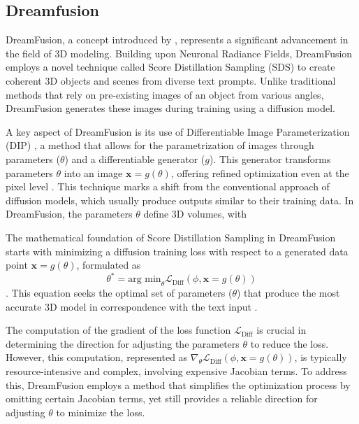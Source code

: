 \subsection{Dreamfusion}\label{dreamfusion}

DreamFusion, a concept introduced by \citeauthor{pooleDreamfusion}, represents a significant advancement in the field of 3D modeling. Building upon Neuronal Radiance Fields, DreamFusion employs a novel technique called Score Distillation Sampling (SDS) to create coherent 3D objects and scenes from diverse text prompts. Unlike traditional methods that rely on pre-existing images of an object from various angles, DreamFusion generates these images during training using a diffusion model.

A key aspect of DreamFusion is its use of Differentiable Image Parameterization (DIP) \citep{mordvintsevDIP}, a method that allows for the parametrization of images through parameters (\( \theta \)) and a differentiable generator (\( g \)). This generator transforms parameters \( \theta \) into an image \( \mathbf{x} = g(\theta) \), offering refined optimization even at the pixel level \citep{pooleDreamfusion}. This technique marks a shift from the conventional approach of diffusion models, which usually produce outputs similar to their training data. In DreamFusion, the parameters \( \theta \) define 3D volumes, with \

The mathematical foundation of Score Distillation Sampling in DreamFusion starts with minimizing a diffusion training loss with respect to a generated data point \( \mathbf{x} = g(\theta) \), formulated as \[ \theta^{*} = \text{arg min}_{\theta} \mathcal{L}_{\text{Diff}}(\phi, \mathbf{x} = g(\theta)) \]. This equation seeks the optimal set of parameters (\( \theta \)) that produce the most accurate 3D model in correspondence with the text input \citep{pooleDreamfusion}.
  
The computation of the gradient of the loss function \( \mathcal{L}_{\text{Diff}} \) is crucial in determining the direction for adjusting the parameters \( \theta \) to reduce the loss. However, this computation, represented as \( \nabla_{\theta}\mathcal{L}_{\text{Diff}}(\phi,\mathbf{x}=g(\theta)) \), is typically resource-intensive and complex, involving expensive Jacobian terms. To address this, DreamFusion employs a method that simplifies the optimization process by omitting certain Jacobian terms, yet still provides a reliable direction for adjusting \( \theta \) to minimize the loss.


